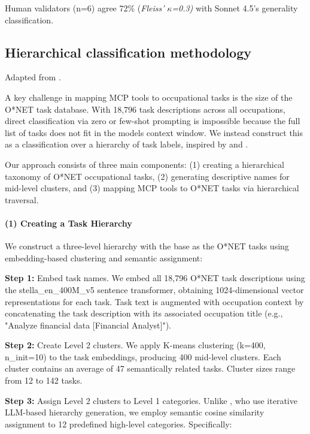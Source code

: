 \documentclass[manuscript,screen,nonacm,oneside]{acmart}
\begin{document}
Human validators (n=6) agree 72\% (\emph{Fleiss'} \(\kappa\)\emph{=0.3)} with Sonnet 4.5's generality classification.

\subsection{Hierarchical classification methodology}
\label{app:hierarchy}

Adapted from \citet[supplementary materials]{handa2025which}.

A key challenge in mapping MCP tools to occupational tasks is the size of the O*NET task database. With 18,796 task descriptions across all occupations, direct classification via zero or few-shot prompting is impossible because the full list of tasks does not fit in the model\textquotesingle s context window. We instead construct this as a classification over a hierarchy of task labels, inspired by \citet{morin2005hierarchical} and \citet{mnih2008scalable}.

Our approach consists of three main components: (1) creating a hierarchical taxonomy of O*NET occupational tasks, (2) generating descriptive names for mid-level clusters, and (3) mapping MCP tools to O*NET tasks via hierarchical traversal.

\paragraph{(1) Creating a Task Hierarchy}\label{creating-a-task-hierarchy}

We construct a three-level hierarchy with the base as the O*NET tasks using embedding-based clustering and semantic assignment:

\textbf{Step 1:} Embed task names. We embed all 18,796 O*NET task descriptions using the stella\_en\_400M\_v5 sentence transformer, obtaining 1024-dimensional vector representations for each task. Task text is augmented with occupation context by concatenating the task description with its associated occupation title (e.g., "Analyze financial data {[}Financial Analyst{]}").

\textbf{Step 2:} Create Level 2 clusters. We apply K-means clustering (k=400, n\_init=10) to the task embeddings, producing 400 mid-level clusters. Each cluster contains an average of 47 semantically related tasks. Cluster sizes range from 12 to 142 tasks.

\textbf{Step 3:} Assign Level 2 clusters to Level 1 categories. Unlike \citet{handa2025which}, who use iterative LLM-based hierarchy generation, we employ semantic cosine similarity assignment to 12 predefined high-level categories. Specifically:
\end{document}
